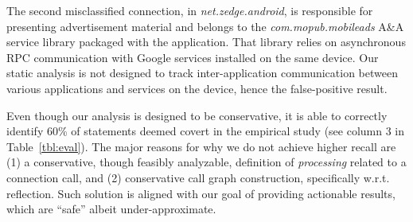 The second misclassified connection, in \emph{net.zedge.android}, is responsible for presenting advertisement material and belongs to the \emph{com.mopub.mobileads} A\&A service library packaged with the application. 
That library relies on asynchronous RPC communication with Google services 
installed on the same device. Our static analysis is not designed to track inter-application communication between various applications and services on the device, hence the false-positive result.   
 

%

Even though our analysis is designed to be conservative, it is able to correctly identify 
60\% of statements deemed covert in the empirical study (see column 3 in Table~\ref{tbl:eval}). 
The major reasons for why we do
not achieve higher recall are (1) a conservative, though feasibly
analyzable, definition of {\it processing} related to a connection
call, and (2) conservative call graph construction, specifically
w.r.t. reflection.
Such solution is aligned with our goal of providing actionable results, which are ``safe'' albeit under-approximate.  

